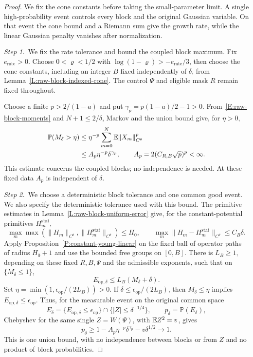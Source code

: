 \begin{proof}
  We fix the cone constants before taking the small-parameter limit. A single
  high-probability event controls every block and the original Gaussian
  variable. On that event the cone bound and a Riemann sum give the growth
  rate, while the linear Gaussian penalty vanishes after normalization.


  \medskip
  \noindent\textit{Step 1.~}We fix the rate tolerance and bound the coupled
  block maximum.
  Fix $e_{\mathrm{rate}} > 0$. Choose $0 < \varrho < 1/2$ with $\log(1-\varrho)
  > -e_{\mathrm{rate}}/3$, then choose the cone constants, including an integer
  $B$ fixed independently of $\delta$, from
  Lemma~\ref{L:raw-block-indexed-cone}. The control $\Psi$ and eligible mask $R$
  remain fixed throughout.

  Choose a finite $p > 2/(1-a)$ and put $\gamma_p = p(1-a)/2-1 > 0$.
  From~\eqref{E:raw-block-moments} and $N+1 \le 2/\delta$, Markov and the union
  bound give, for $\eta > 0$,
  \[
    \begin{split}
      \mathbb{P}(M_\delta>\eta)
      &\le\eta^{-p}\sum_{m=0}^N
      \mathbb{E}\|X_m\|_{C^\theta}^p\\
      &\le A_p\eta^{-p}\delta^{\gamma_p},\qquad
      A_p=2(C_{R,B}\sqrt p)^p<\infty.
    \end{split}
  \]
  This estimate concerns the coupled blocks; no independence is needed. At these
  fixed data $A_p$ is independent of $\delta$.


  \medskip
  \noindent\textit{Step 2.~}We choose a deterministic block tolerance and one
  common good event.
  We also specify the deterministic tolerance used with this bound. The
  primitive estimates in Lemma~\ref{L:raw-block-uniform-error} give, for the
  constant-potential primitives $H_m^{\mathrm{stat}}$,
  \[
    \max_m\max(\|H_m\|_{C^\theta},
    \|H_m^{\mathrm{stat}}\|_{C^\theta})\le H_0,\qquad
    \max_m\|H_m-H_m^{\mathrm{stat}}\|_{C^\theta}\le C_B\delta.
  \]
  Apply Proposition~\ref{P:constant-young-linear} on the fixed ball of operator
  paths of radius $H_0+1$ and use the bounded free groups on $[0,B]$. There is
  $L_B \ge 1$, depending on these fixed $R,B,\Psi$ and the admissible exponents,
  such that on $\{M_\delta\le1\}$,
  \[
    E_{\mathrm{op},\delta}\le L_B(M_\delta+\delta).
  \]
  Set $\eta = \min(1,\epsilon_{\mathrm{op}}/(2L_B)) > 0$. If $\delta \le
  \epsilon_{\mathrm{op}}/(2L_B)$, then $M_\delta \le \eta$ implies
  $E_{\mathrm{op},\delta} \le \epsilon_{\mathrm{op}}$. Thus, for the measurable
  event on the original common space
  \[
    E_\delta=\{E_{\mathrm{op},\delta}\le\epsilon_{\mathrm{op}}\}
    \cap\{|Z|\le\delta^{-1/4}\},\qquad
    p_\delta=\mathbb{P}(E_\delta),
  \]
  Chebyshev for the same single $Z = W(\Psi)$, with $\mathbb{E} Z^2 = v$, gives
  \[
    p_\delta\ge1-A_p\eta^{-p}\delta^{\gamma_p}
    -v\delta^{1/2}\longrightarrow1.
  \]
  This is one union bound, with no independence between blocks or from $Z$ and
  no product of block probabilities.



\end{proof}
